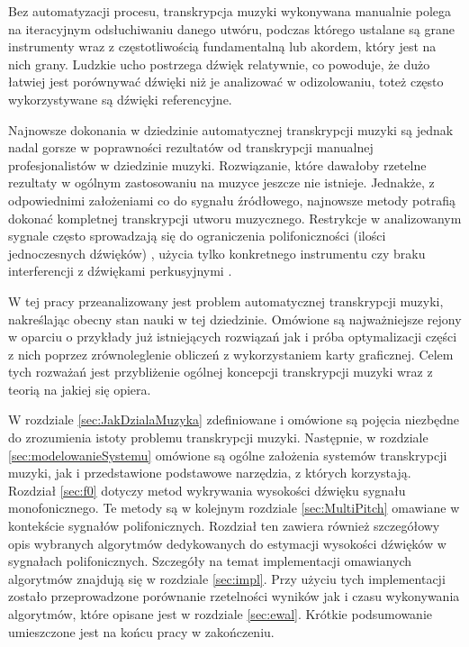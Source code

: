 \documentclass[12pt,a4paper,twoside]{mwart}
\begin{document}
Bez automatyzacji procesu, transkrypcja muzyki wykonywana manualnie polega na iteracyjnym odsłuchiwaniu danego utwóru, podczas którego ustalane są grane instrumenty wraz z częstotliwością fundamentalną lub akordem, który jest na nich grany.  Ludzkie ucho postrzega dźwięk relatywnie, co powoduje, że dużo łatwiej jest porównywać dźwięki niż je analizować w odizolowaniu, toteż często wykorzystywane są dźwięki referencyjne.

Najnowsze dokonania w dziedzinie automatycznej transkrypcji muzyki są jednak nadal gorsze w poprawności rezultatów od transkrypcji manualnej profesjonalistów w dziedzinie muzyki. Rozwiązanie, które dawałoby rzetelne rezultaty w ogólnym zastosowaniu na muzyce jeszcze nie istnieje. Jednakże, z odpowiednimi założeniami co do sygnału źródłowego, najnowsze metody potrafią dokonać kompletnej transkrypcji utworu muzycznego. Restrykcje w analizowanym sygnale często sprowadzają się do ograniczenia polifoniczności (ilości jednoczesnych dźwięków) 
\cite[1-2]{Transcription:BayesianHarmonicModels},
użycia tylko konkretnego instrumentu \cite{Transcription:Hawthorne:OnsetsAndFrames} czy braku interferencji z dźwiękami perkusyjnymi \cite{Transcription:Kameoka:HarmonicSeparation}.

W tej pracy przeanalizowany jest problem automatycznej transkrypcji muzyki, nakreślając obecny stan nauki w tej dziedzinie. Omówione są najważniejsze rejony w oparciu o przykłady już istniejących rozwiązań jak i próba optymalizacji części z nich poprzez zrównoleglenie obliczeń z wykorzystaniem karty graficznej. Celem tych rozważań jest przybliżenie ogólnej koncepcji transkrypcji muzyki wraz z teorią na jakiej się opiera.

W rozdziale \ref{sec:JakDzialaMuzyka} zdefiniowane i omówione są pojęcia niezbędne do zrozumienia istoty problemu transkrypcji muzyki. Następnie, w rozdziale \ref{sec:modelowanieSystemu} omówione są ogólne założenia systemów transkrypcji muzyki, jak i przedstawione podstawowe narzędzia, z których korzystają. Rozdział \ref{sec:f0} dotyczy metod wykrywania wysokości dźwięku sygnału monofonicznego. Te metody są w kolejnym rozdziale \ref{sec:MultiPitch} omawiane w kontekście sygnałów polifonicznych. Rozdział ten zawiera również szczegółowy opis wybranych algorytmów dedykowanych do estymacji wysokości dźwięków w sygnałach polifonicznych. Szczegóły na temat implementacji omawianych algorytmów znajdują się w rozdziale \ref{sec:impl}. Przy użyciu tych implementacji zostało przeprowadzone porównanie rzetelności wyników jak i czasu wykonywania algorytmów, które opisane jest w rozdziale \ref{sec:ewal}. Krótkie podsumowanie umieszczone jest na końcu pracy w zakończeniu. 
\end{document}
